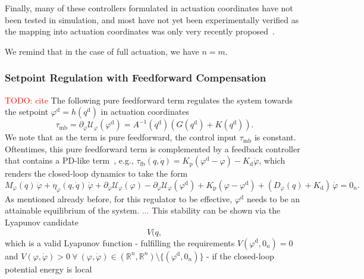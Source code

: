 Finally, many of these controllers formulated in actuation coordinates have not been tested in simulation, and most have not yet been experimentally verified as the mapping into actuation coordinates was only very recently proposed~\citep{pustina2024input}.

We remind that in the case of full actuation, we have $n = m$.

\subsubsection{Setpoint Regulation with Feedforward Compensation}
\textcolor{red}{TODO: cite }
The following pure feedforward term regulates the system towards the setpoint $\varphi^\mathrm{d} = h(q^\mathrm{d})$ in actuation coordinates~\citep{kelly1994pd, borja2022energy, della2023model, pustina2025analysis}
\begin{equation}\label{eq:background:model_based_control:fully_actuated:potential_shaping_regulation}
    \tau_\mathrm{mb} = \partial_{\varphi} \mathcal{U}_\varphi(\varphi^\mathrm{d})  = A^{-1}(q^\mathrm{d}) \left ( G(q^\mathrm{d}) + K(q^\mathrm{d}) \right ).
\end{equation}
We note that as the term is pure feedforward, the control input $\tau_\mathrm{mb}$ is constant.
Oftentimes, this pure feedforward term is complemented by a feedback controller that contains a PD-like term~\citep{della2023model}, e.g., $\tau_\mathrm{fb}(q,\dot{q}) = K_\mathrm{p} \left ( \varphi^\mathrm{d} - \varphi \right ) - K_\mathrm{d} \dot{\varphi}$, which renders the closed-loop dynamics to take the form
\begin{equation}
    M_\varphi(q) \, \ddot{\varphi} + \eta_\varphi(q,\dot{q}) \, \dot{\varphi} + \partial_{\varphi} \mathcal{U}_\varphi(\varphi) - \partial_{\varphi} \mathcal{U}_\varphi(\varphi^\mathrm{d}) + K_\mathrm{p}  \left ( \varphi - \varphi^\mathrm{d} \right ) + \left ( D_\varphi(q) + K_\mathrm{d} \right ) \, \dot{\varphi} = 0_n.
\end{equation}
As mentioned already before, for this regulator to be effective, $\varphi^\mathrm{d}$ needs to be an attainable equilibrium of the system.
\textcolor{red}{...}
This stability can be shown via the Lyapunov candidate~\citep{della2023model}
\begin{equation}
    V(q,
\end{equation}
which is a valid Lyapunov function - fulfilling the requirements $V(\varphi^\mathrm{d},0_n) = 0$ and $V(\varphi,\dot{\varphi}) > 0 \: \forall \: (\varphi, \dot{\varphi}) \in (\mathbb{R}^n, \mathbb{R}^n) \setminus \{ (\varphi^\mathrm{d}, 0_n) \}$ - if the closed-loop potential energy is local



